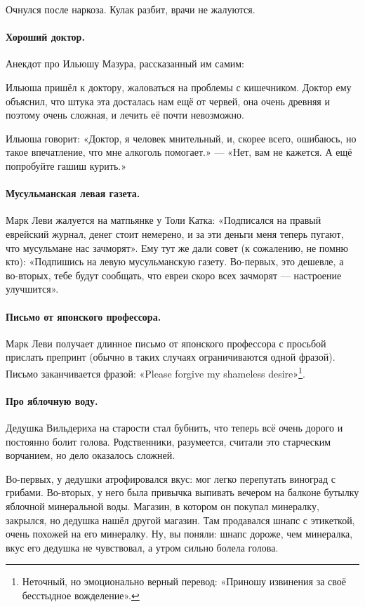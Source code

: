 \documentclass{book}
\begin{document}
Очнулся после наркоза.
Кулак разбит, врачи не жалуются.

\paragraph{Хороший доктор.}
Анекдот про Ильюшу Мазура, рассказанный им самим:

Ильюша пришёл к доктору, жаловаться на проблемы с кишечником.
Доктор ему объяснил, что штука эта досталась нам ещё от червей, она очень древняя и поэтому очень сложная, и лечить её почти невозможно.

Ильюша говорит: «Доктор, я человек мнительный, и, скорее всего, ошибаюсь, но такое впечатление, что мне алкоголь помогает.» --- «Нет, вам не кажется. А ещё попробуйте гашиш курить.»


\paragraph{Мусульманская левая газета.}
Марк Леви жалуется на матпьянке у Толи Катка: «Подписался на правый еврейский журнал, денег стоит немерено, и за эти деньги меня теперь пугают, что мусульмане нас зачморят».
Ему тут же дали совет (к сожалению, не помню кто):
«Подпишись на левую мусульманскую газету. 
Во-первых, это дешевле, а во-вторых, тебе будут сообщать, что евреи скоро всех зачморят --- настроение улучшится».

\paragraph{Письмо от японского профессора.}
Марк Леви получает длинное письмо от японского профессора с просьбой прислать препринт (обычно в таких случаях ограничиваются одной фразой).
Письмо заканчивается фразой: «Please forgive my shameless desire»\footnote{Неточный, но эмоционально верный перевод: «Приношу извинения за своё бесстыдное вожделение».}.

\paragraph{Про яблочную воду.}
Дедушка Вильдериха на старости стал бубнить, что теперь всё очень дорого и постоянно болит голова.
Родственники, разумеется, считали это старческим ворчанием, но дело оказалось сложней.

Во-первых, у дедушки атрофировался вкус: мог легко перепутать виноград с грибами.
Во-вторых, у него была привычка выпивать вечером на балконе бутылку яблочной минеральной воды.
Магазин, в котором он покупал минералку, закрылся, но дедушка нашёл другой магазин.
Там продавался шнапс с этикеткой, очень похожей на его минералку.
Ну, вы поняли: шнапс дороже, чем минералка, вкус его дедушка не чувствовал, а утром сильно болела голова.
\end{document}
